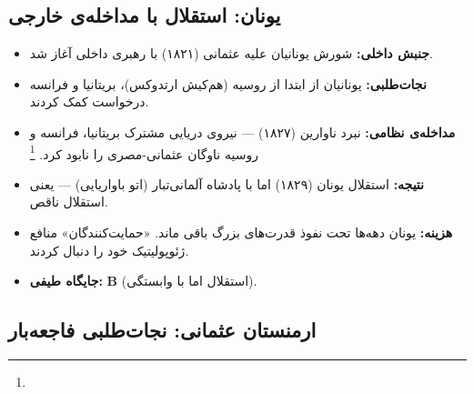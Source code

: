 \subsection{یونان: استقلال با مداخله‌ی خارجی}

\begin{tcolorbox}[casebox, title={نمونه: استقلال یونان (۱۸۲۱–۱۸۲۹)}]
\begin{itemize}[nosep, rightmargin=1em]
  \item \textbf{جنبش داخلی:} شورش یونانیان علیه عثمانی (۱۸۲۱) با رهبری داخلی آغاز شد.
  \item \textbf{نجات‌طلبی:} یونانیان از ابتدا از روسیه (هم‌کیش ارتدوکس)، بریتانیا و فرانسه درخواست کمک کردند.
  \item \textbf{مداخله‌ی نظامی:} نبرد ناوارین (۱۸۲۷) — نیروی دریایی مشترک بریتانیا، فرانسه و روسیه ناوگان عثمانی-مصری را نابود کرد.%
  \footnote{}
  \item \textbf{نتیجه:} استقلال یونان (۱۸۲۹) اما با پادشاه آلمانی‌تبار (اتو باواریایی) — یعنی استقلال ناقص.
  \item \textbf{هزینه:} یونان دهه‌ها تحت نفوذ قدرت‌های بزرگ باقی ماند. «حمایت‌کنندگان» منافع ژئوپولیتیک خود را دنبال کردند.
  \item \textbf{جایگاه طیفی:} \textbf{B} (استقلال اما با وابستگی).
\end{itemize}
\end{tcolorbox}

\subsection{ارمنستان عثمانی: نجات‌طلبی فاجعه‌بار}

